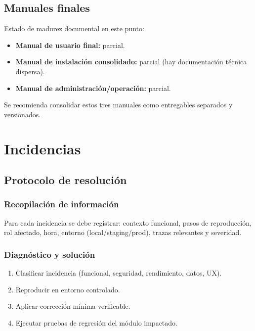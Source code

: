 \documentclass[
  11pt,
  a4paper,
  twoside=false,
  parskip=half               %
]{scrreprt}                  %
\providecommand{\tightlist}{%
  \setlength{\itemsep}{0pt}\setlength{\parskip}{0pt}}
\begin{document}
\hypertarget{manuales-finales}{%
\subsection{Manuales finales}\label{manuales-finales}}

Estado de madurez documental en este punto:

\begin{itemize}
\tightlist
\item
  \textbf{Manual de usuario final:} parcial.
\item
  \textbf{Manual de instalación consolidado:} parcial (hay documentación
  técnica dispersa).
\item
  \textbf{Manual de administración/operación:} parcial.
\end{itemize}

Se recomienda consolidar estos tres manuales como entregables separados
y versionados.

\hypertarget{incidencias}{%
\section{Incidencias}\label{incidencias}}

\hypertarget{protocolo-de-resoluciuxf3n}{%
\subsection{Protocolo de resolución}\label{protocolo-de-resoluciuxf3n}}

\hypertarget{recopilaciuxf3n-de-informaciuxf3n}{%
\subsubsection{Recopilación de
información}\label{recopilaciuxf3n-de-informaciuxf3n}}

Para cada incidencia se debe registrar: contexto funcional, pasos de
reproducción, rol afectado, hora, entorno (local/staging/prod), trazas
relevantes y severidad.

\hypertarget{diagnuxf3stico-y-soluciuxf3n}{%
\subsubsection{Diagnóstico y
solución}\label{diagnuxf3stico-y-soluciuxf3n}}

\begin{enumerate}
\def\labelenumi{\arabic{enumi}.}
\tightlist
\item
  Clasificar incidencia (funcional, seguridad, rendimiento, datos, UX).
\item
  Reproducir en entorno controlado.
\item
  Aplicar corrección mínima verificable.
\item
  Ejecutar pruebas de regresión del módulo impactado.
\end{enumerate}
\end{document}

